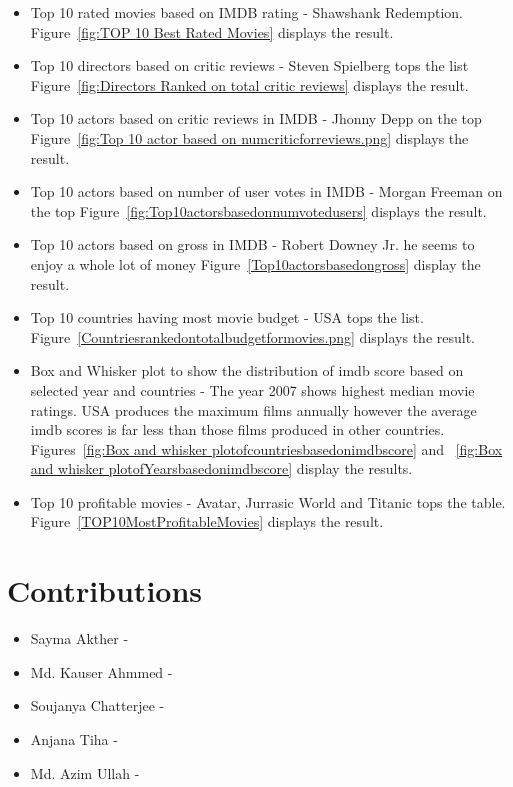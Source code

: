 \documentclass{article}%
\begin{document}
\begin{itemize}
\item Top 10 rated movies based on IMDB rating - Shawshank Redemption. Figure~\ref{fig:TOP 10 Best Rated Movies} displays the result.
\item Top 10 directors based on critic reviews - Steven Spielberg tops the list Figure~\ref{fig:Directors Ranked on total critic reviews} displays the result.
\item Top 10 actors based on critic reviews in IMDB - Jhonny Depp on the top Figure~\ref{fig:Top 10 actor based on numcriticforreviews.png} displays the result.
\item Top 10 actors based on number of user votes in IMDB - Morgan Freeman on the top Figure~\ref{fig:Top10actorsbasedonnumvotedusers} displays the result.
\item Top 10 actors based on gross in IMDB - Robert Downey Jr. he seems to enjoy a whole lot of money Figure~\ref{Top10actorsbasedongross} display the result.
\item Top 10 countries having most movie budget - USA tops the list. Figure~\ref{Countriesrankedontotalbudgetformovies.png} displays the result.
\item Box and Whisker plot to show the distribution of imdb score based on selected year and countries - The year 2007 shows highest median movie ratings. USA produces the maximum films annually however the average imdb scores is far less than those films produced in other countries. Figures~\ref{fig:Box and whisker plotofcountriesbasedonimdbscore} and ~\ref{fig:Box and whisker plotofYearsbasedonimdbscore} display the results.
\item Top 10 profitable movies - Avatar, Jurrasic World and Titanic tops the table. Figure~\ref{TOP10MostProfitableMovies} displays the result.
\end{itemize}

\section{Contributions}

\begin{itemize}
\item Sayma Akther - 
\item Md. Kauser Ahmmed - 
\item Soujanya Chatterjee - 
\item Anjana Tiha - 
\item Md. Azim Ullah -
\end{itemize}
\end{document}
